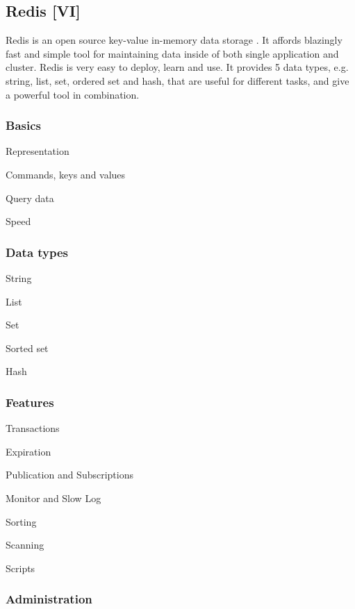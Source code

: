 \subsection{Redis [VI]}

Redis is an open source key-value in-memory data storage \cite{Seguin2012} \cite{Redis}.
It affords blazingly fast and simple tool for maintaining data inside of both single application and cluster.
Redis is very easy to deploy, learn and use.
It provides 5 data types, e.g. string, list, set, ordered set and hash, that are useful for different tasks, and give a powerful tool in combination.

\subsubsection{Basics}

Representation

Commands, keys and values

Query data

Speed

\subsubsection{Data types}

String

List

Set

Sorted set

Hash

\subsubsection{Features}

Transactions

Expiration

Publication and Subscriptions

Monitor and Slow Log

Sorting

Scanning

Scripts

\subsubsection{Administration}

